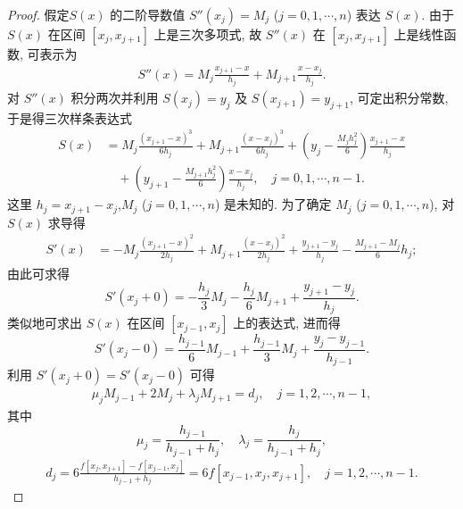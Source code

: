 \documentclass[../../main.tex]{subfiles}
\begin{document}
\begin{proof}
假定$S(x)$ 的二阶导数值 $S''(x_j) = M_j$ ($j = 0, 1, \cdots, n$) 表达 $S(x)$. 由于 $S(x)$ 在区间 $[x_j, x_{j + 1}]$ 上是三次多项式, 故 $S''(x)$ 在 $[x_j, x_{j + 1}]$ 上是线性函数, 可表示为
\begin{align}
S''(x) = M_j \frac{x_{j + 1} - x}{h_j} + M_{j + 1} \frac{x - x_j}{h_j}. \label{eq:数值分析-6.7}
\end{align}
对 $S''(x)$ 积分两次并利用 $S(x_j) = y_j$ 及 $S(x_{j + 1}) = y_{j + 1}$, 可定出积分常数, 于是得三次样条表达式
\begin{align}
S(x) &= M_j \frac{(x_{j + 1} - x)^3}{6 h_j} + M_{j + 1} \frac{(x - x_j)^3}{6 h_j} + \left( y_j - \frac{M_j h_j^2}{6} \right) \frac{x_{j + 1} - x}{h_j} \nonumber \\
&\quad + \left( y_{j + 1} - \frac{M_{j + 1} h_j^2}{6} \right) \frac{x - x_j}{h_j}, \quad j = 0, 1, \cdots, n - 1. \label{eq:数值分析-6.8}
\end{align}
这里 $h_j=x_{j+1}-x_j$,$M_j$ ($j = 0, 1, \cdots, n$) 是未知的. 为了确定 $M_j$ ($j = 0, 1, \cdots, n$), 对 $S(x)$ 求导得
\begin{align}
S'(x) &= -M_j \frac{(x_{j + 1} - x)^2}{2 h_j} + M_{j + 1} \frac{(x - x_j)^2}{2 h_j} + \frac{y_{j + 1} - y_j}{h_j} - \frac{M_{j + 1} - M_j}{6} h_j; \label{eq:数值分析-6.9}
\end{align}
由此可求得
\[
S'(x_j + 0) = -\frac{h_j}{3} M_j - \frac{h_j}{6} M_{j + 1} + \frac{y_{j + 1} - y_j}{h_j}.
\]
类似地可求出 $S(x)$ 在区间 $[x_{j - 1}, x_j]$ 上的表达式, 进而得
\[
S'(x_j - 0) = \frac{h_{j - 1}}{6} M_{j - 1} + \frac{h_{j - 1}}{3} M_j + \frac{y_j - y_{j - 1}}{h_{j - 1}}.
\]
利用 $S'(x_j + 0) = S'(x_j - 0)$ 可得
\begin{align}
\mu_j M_{j - 1} + 2 M_j + \lambda_j M_{j + 1} = d_j, \quad j = 1, 2, \cdots, n - 1, \label{eq:数值分析-6.10}
\end{align}
其中
\[
\mu_j = \frac{h_{j - 1}}{h_{j - 1} + h_j}, \quad \lambda_j = \frac{h_j}{h_{j - 1} + h_j},
\]
\begin{align}
d_j = 6 \frac{f[x_j, x_{j + 1}] - f[x_{j - 1}, x_j]}{h_{j - 1} + h_j} = 6 f[x_{j - 1}, x_j, x_{j + 1}], \quad j = 1, 2, \cdots, n - 1. \label{eq:数值分析-6.11}
\end{align}


\end{proof}
\end{document}

